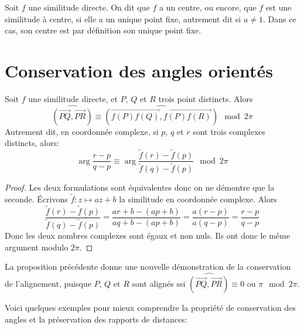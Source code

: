 \begin{definition}
Soit $f$ une similitude directe. On dit que $f$ a un centre, ou encore, que $f$ est une similitude à centre, si elle a un unique point fixe, autrement dit si $a\neq 1$. Dans ce cas, son centre est par définition son unique point fixe.
\end{definition}

\section{Conservation des angles orientés}


\begin{proposition}
Soit $f$ une similitude directe, et $P$, $Q$ et $R$ trois point distincts. Alors
\[ \widehat{(\overrightarrow{PQ}, \overrightarrow{PR})}
\equiv \widehat{(\overrightarrow{f(P)f(Q)}, \overrightarrow{f(P)f(R)})} \mod 2\pi\]
Autrement dit, en coordonnée complexe, si $p$, $q$ et $r$ sont trois complexes distincts, alors:
\[ \arg\frac{r-p}{q-p} \equiv \arg \frac{\tilde f(r)-\tilde f(p)}{\tilde f(q)-\tilde f(p)} \mod 2\pi\]
\end{proposition}
\begin{proof}
Les deux formulations sont équivalentes donc on ne démontre que la seconde. Écrivons $\tilde f : z\mapsto az+b$ la similitude en coordonnée complexe. Alors
\[ \frac{\tilde f(r)-\tilde f(p)}{\tilde f(q)-\tilde f(p)}
=\frac{ar+b-(ap+b)}{aq+b-(ap+b)}
=\frac{a(r-p)}{a(q-p)}
=\frac{r-p}{q-p}
\]
Donc les deux nombres complexes sont égaux et non nuls. Ils ont donc le même argument modulo $2\pi$.
\end{proof}

\begin{remarque}
La proposition précédente donne une nouvelle démonstration de la conservation de l'alignement, puisque $P$, $Q$ et $R$ sont alignés ssi $\widehat{(\overrightarrow{PQ}, \overrightarrow{PR})}\equiv 0\text{ ou } \pi \mod 2\pi$.
\end{remarque}


Voici quelques exemples pour mieux comprendre la propriété de conservation des angles et la préservation des rapports de distances:


